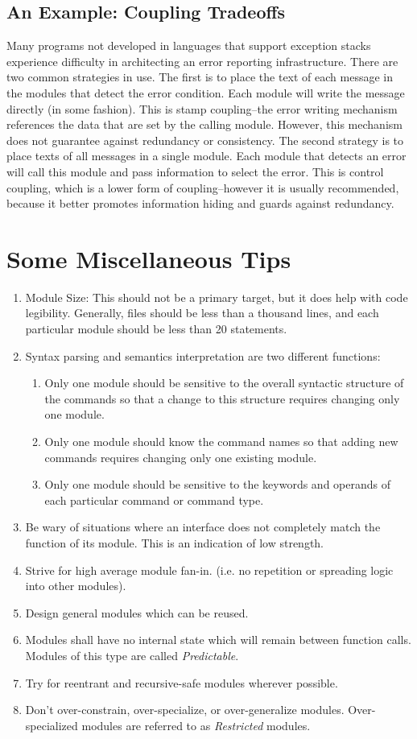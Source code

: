\documentclass{designdoc}
\begin{document}
\subsection{An Example: Coupling Tradeoffs}
Many programs not developed in languages that support exception stacks
experience difficulty in architecting an error reporting infrastructure. There
are two common strategies in use. The first is to place the text of each
message in the modules that detect the error condition. Each module will write
the message directly (in some fashion). This is stamp coupling--the error
writing mechanism references the data that are set by the calling module.
However, this mechanism does not guarantee against redundancy or consistency.
The second strategy is to place texts of all messages in a single module. Each
module that detects an error will call this module and pass information to
select the error. This is control coupling, which is a lower form of
coupling--however it is usually recommended, because it better promotes
information hiding and guards against redundancy.

\section{Some Miscellaneous Tips}
\begin{enumerate}
\item Module Size: This should not be a primary target, but it does help with
  code legibility. Generally, files should be less than a thousand lines, and
  each particular module should be less than 20 statements.
\item Syntax parsing and semantics interpretation are two different functions:
  \begin{enumerate}
  \item Only one module should be sensitive to the overall syntactic structure
    of the commands so that a change to this structure requires changing only
    one module.
  \item Only one module should know the command names so that adding new
    commands requires changing only one existing module.
  \item Only one module should be sensitive to the keywords and operands of
    each particular command or command type.
  \end{enumerate}
\item Be wary of situations where an interface does not completely match the
  function of its module. This is an indication of low strength.
\item Strive for high average module fan-in. (i.e. no repetition or spreading
  logic into other modules).
\item Design general modules which can be reused.
\item Modules shall have no internal state which will remain between function
  calls. Modules of this type are called {\it Predictable}.
\item Try for reentrant and recursive-safe modules wherever possible.
\item Don't over-constrain, over-specialize, or over-generalize modules.
  Over-specialized modules are referred to as {\it Restricted} modules.
\end{enumerate}
\end{document}
